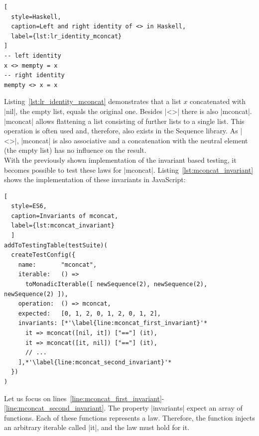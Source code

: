 \begin{lstlisting}[
  style=Haskell,
  caption=Left and right identity of <> in Haskell,
  label={lst:lr_identity_mconcat}
]
-- left identity
x <> mempty = x
-- right identity
mempty <> x = x
\end{lstlisting}

Listing~\ref{lst:lr_identity_mconcat} demonstrates that a list $x$ concatenated
with |nil|, the empty list, equals the original one. 
Besides |<>| there is also |mconcat|. |mconcat| allows flattening a list consisting
of further lists to a single list. This operation is often used and, therefore,
also exists in the Sequence library. As |<>|, |mconcat| is also
associative and a concatenation with the neutral element (the empty list)
has no influence on the result.\\ 
With the previously shown implementation of the invariant based testing, it
becomes possible to test these laws for |mconcat|.
Listing~\ref{lst:mconcat_invariant} shows the implementation of these
invariants in JavaScript:

\begin{lstlisting}[
  style=ES6, 
  caption=Invariants of mconcat,
  label={lst:mconcat_invariant}
  ]
addToTestingTable(testSuite)(
  createTestConfig({
    name:       "mconcat",
    iterable:   () => 
      toMonadicIterable([ newSequence(2), newSequence(2), newSequence(2) ]),
    operation:  () => mconcat,
    expected:   [0, 1, 2, 0, 1, 2, 0, 1, 2],
    invariants: [*'\label{line:mconcat_first_invariant}'*
      it => mconcat([nil, it]) ["=="] (it),
      it => mconcat([it, nil]) ["=="] (it),
      // ...
    ],*'\label{line:mconcat_second_invariant}'*
  })
)
\end{lstlisting}

Let us focus on lines~\ref{line:mconcat_first_invariant}-\ref{line:mconcat_second_invariant}.
The property |invariants| expect an array of functions. Each of these
functions represents a law. Therefore, the function injects an arbitrary
iterable called |it|, and the law must hold for it.

